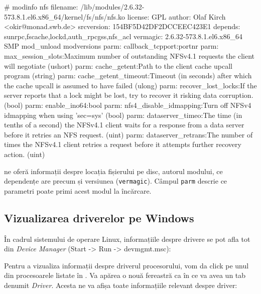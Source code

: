 \begin{screen}# modinfo nfs
filename:       /lib/modules/2.6.32-573.8.1.el6.x86_64/kernel/fs/nfs/nfs.ko
license:        GPL
author:         Olaf Kirch <okir@monad.swb.de>
srcversion:     154BF5D42DF2DCCEEC423E1
depends:        sunrpc,fscache,lockd,auth_rpcgss,nfs_acl
vermagic:       2.6.32-573.8.1.el6.x86_64 SMP mod_unload modversions
parm:           callback_tcpport:portnr
parm:           max_session_slots:Maximum number of outstanding NFSv4.1 requests the client will negotiate (ushort)
parm:           cache_getent:Path to the client cache upcall program (string)
parm:           cache_getent_timeout:Timeout (in seconds) after which the cache upcall is assumed to have failed (ulong)
parm:           recover_lost_locks:If the server reports that a lock might be lost, try to recover it risking data corruption. (bool)
parm:           enable_ino64:bool
parm:           nfs4_disable_idmapping:Turn off NFSv4 idmapping when using 'sec=sys' (bool)
parm:           dataserver_timeo:The time (in tenths of a second) the NFSv4.1  client  waits for a response from a  data server before it retries an NFS request. (uint)
parm:           dataserver_retrans:The  number of times the NFSv4.1 client retries a request before it attempts further  recovery  action. (uint)
\end{screen}

 ne oferă informații despre locația fișierului pe disc, autorul
modului, ce dependențe are precum și versiunea (\texttt{vermagic}). Câmpul
\texttt{parm} descrie ce parametri poate primi acest modul la încărcare.

\subsection{Vizualizarea driverelor pe Windows}
\label{sec:hardware-virtualizare-windows}

În cadrul sistemului de operare Linux, informațiile despre drivere se pot afla
tot din \textit{Device Manager} (Start -> Run -> devmgmt.msc):

Pentru a vizualiza informații despre driverul procesorului, vom da click pe unul
din procesoarele listate în . Va
apărea o nouă fereastră ca în  ce va avea
un tab denumit \textit{Driver}. Acesta ne va afișa toate informațiile relevant
despre driver:

